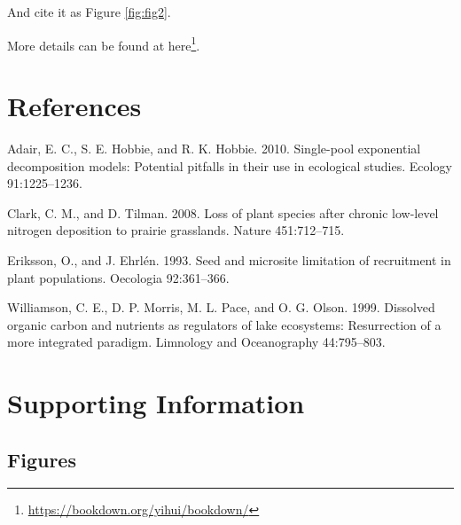 \documentclass[
  12pt,
]{article}
\DeclareRobustCommand{\href}[2]{#2\footnote{\url{#1}}}
\newlength{\cslhangindent}
\newlength{\cslentryspacingunit} %
\newenvironment{CSLReferences}[2] %
 {%
  \setlength{\parindent}{0pt}
  \ifodd #1
  \let\oldpar\par
  \def\par{\hangindent=\cslhangindent\oldpar}
  \fi
  \setlength{\parskip}{#2\cslentryspacingunit}
 }%
 {}
\begin{document}
And cite it as Figure \ref{fig:fig2}.



More details can be found at \href{https://bookdown.org/yihui/bookdown/}{here}.

\hypertarget{references}{%
\section{References}\label{references}}

\hypertarget{refs}{}
\begin{CSLReferences}{1}{0}
\leavevmode{}%
Adair, E. C., S. E. Hobbie, and R. K. Hobbie. 2010. Single-pool exponential decomposition models: Potential pitfalls in their use in ecological studies. Ecology 91:1225--1236.

\leavevmode{}%
Clark, C. M., and D. Tilman. 2008. Loss of plant species after chronic low-level nitrogen deposition to prairie grasslands. Nature 451:712--715.

\leavevmode{}%
Eriksson, O., and J. Ehrlén. 1993. Seed and microsite limitation of recruitment in plant populations. Oecologia 92:361--366.

\leavevmode{}%
Williamson, C. E., D. P. Morris, M. L. Pace, and O. G. Olson. 1999. Dissolved organic carbon and nutrients as regulators of lake ecosystems: Resurrection of a more integrated paradigm. Limnology and Oceanography 44:795--803.

\end{CSLReferences}

\clearpage

\setcounter{page}{0}
\setcounter{page}{1}

\setcounter{figure}{0}
\setcounter{table}{0}
\renewcommand {\thetable}{S\arabic{table}}
\renewcommand {\thefigure}{S\arabic{figure}}

\hypertarget{supporting-information}{%
\section{Supporting Information}\label{supporting-information}}

\hypertarget{figures-1}{%
\subsection{Figures}\label{figures-1}}
\end{document}
